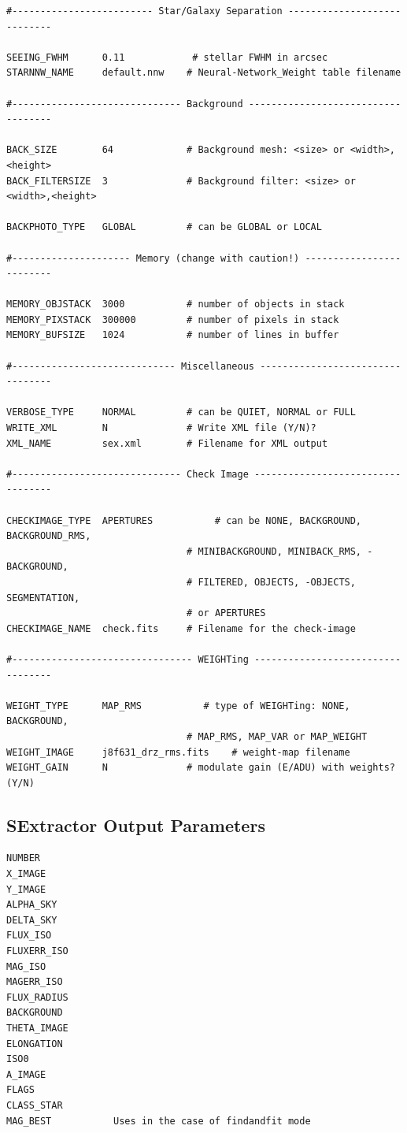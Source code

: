 \documentclass[a4paper,10pt]{article}
\begin{document}
\begin{footnotesize}
\begin{verbatim}
#------------------------- Star/Galaxy Separation ----------------------------
 
SEEING_FWHM      0.11            # stellar FWHM in arcsec
STARNNW_NAME     default.nnw    # Neural-Network_Weight table filename
 
#------------------------------ Background -----------------------------------
 
BACK_SIZE        64             # Background mesh: <size> or <width>,<height>
BACK_FILTERSIZE  3              # Background filter: <size> or <width>,<height>
 
BACKPHOTO_TYPE   GLOBAL         # can be GLOBAL or LOCAL
 
#--------------------- Memory (change with caution!) -------------------------
 
MEMORY_OBJSTACK  3000           # number of objects in stack
MEMORY_PIXSTACK  300000         # number of pixels in stack
MEMORY_BUFSIZE   1024           # number of lines in buffer
 
#----------------------------- Miscellaneous ---------------------------------
 
VERBOSE_TYPE     NORMAL         # can be QUIET, NORMAL or FULL
WRITE_XML        N              # Write XML file (Y/N)?
XML_NAME         sex.xml        # Filename for XML output

#------------------------------ Check Image ----------------------------------

CHECKIMAGE_TYPE  APERTURES           # can be NONE, BACKGROUND, BACKGROUND_RMS,
                                # MINIBACKGROUND, MINIBACK_RMS, -BACKGROUND,
                                # FILTERED, OBJECTS, -OBJECTS, SEGMENTATION,
                                # or APERTURES
CHECKIMAGE_NAME  check.fits     # Filename for the check-image

#-------------------------------- WEIGHTing ----------------------------------

WEIGHT_TYPE      MAP_RMS           # type of WEIGHTing: NONE, BACKGROUND,
                                # MAP_RMS, MAP_VAR or MAP_WEIGHT
WEIGHT_IMAGE     j8f631_drz_rms.fits    # weight-map filename
WEIGHT_GAIN      N              # modulate gain (E/ADU) with weights? (Y/N)
\end{verbatim}
\end{footnotesize}
\subsection{SExtractor Output Parameters}
\begin{footnotesize}
\begin{verbatim}
NUMBER
X_IMAGE
Y_IMAGE
ALPHA_SKY
DELTA_SKY
FLUX_ISO
FLUXERR_ISO
MAG_ISO
MAGERR_ISO
FLUX_RADIUS
BACKGROUND
THETA_IMAGE
ELONGATION
ISO0
A_IMAGE
FLAGS
CLASS_STAR
MAG_BEST           Uses in the case of findandfit mode
\end{verbatim}
\end{footnotesize}
\end{document}
